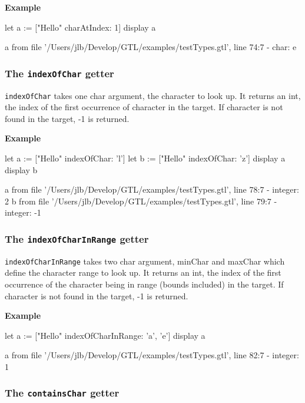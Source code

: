 \documentclass[10pt,openright,twosides]{report}
\newcommand{\icst}[1]{{\footnotesize\ttfamily\colorbox{light-blue}{#1}}}
\newcommand{\gtlarg}[1]{{\footnotesize\ttfamily\colorbox{light-blue}{#1}}}
\newcommand{\gtlinline}[1]{\colorbox{light-blue}{\lstinline[language=gtl]{#1}}}
\newcommand{\example}{\vspace{.75em}\noindent\textbf{Example}\vspace{0em}}
\begin{document}
\example
\begin{gtl}
let a := ["Hello" charAtIndex: 1]
display a
\end{gtl}
\begin{console}
a from file '/Users/jlb/Develop/GTL/examples/testTypes.gtl', line 74:7
  - char: e
\end{console}


\subsubsection{The \texttt{indexOfChar} getter}

\gtlinline{indexOfChar} takes one char argument, the \gtlarg{character} to look up. It returns an int, the index of the first occurrence of \gtlarg{character} in the target. If \gtlarg{character} is not found in the target, \icst{-1} is returned.

\example
\begin{gtl}
let a := ["Hello" indexOfChar: 'l']
let b := ["Hello" indexOfChar: 'z']
display a
display b
\end{gtl}
\begin{console}
a from file '/Users/jlb/Develop/GTL/examples/testTypes.gtl', line 78:7
  - integer: 2
b from file '/Users/jlb/Develop/GTL/examples/testTypes.gtl', line 79:7
  - integer: -1
\end{console}

\subsubsection{The \texttt{indexOfCharInRange} getter}

\gtlinline{indexOfCharInRange} takes two char argument, \gtlarg{minChar} and \gtlarg{maxChar} which define the character range to look up. It returns an int, the index of the first occurrence of the character being in range (bounds included) in the target. If \gtlarg{character} is not found in the target, \icst{-1} is returned.

\example
\begin{gtl}
let a := ["Hello" indexOfCharInRange: 'a', 'e']
display a
\end{gtl}
\begin{console}
a from file '/Users/jlb/Develop/GTL/examples/testTypes.gtl', line 82:7
  - integer: 1
\end{console}

\subsubsection{The \texttt{containsChar} getter}
\end{document}
